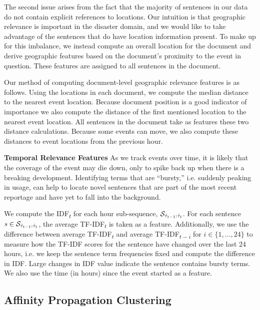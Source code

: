 The second issue arises from the fact that the majority of sentences in our
data do not contain explicit references to locations.  Our intuition is that
geographic relevance is important in the disaster domain, and we would like to
take advantage of the sentences that do have location information present. To
make up for this imbalance, we instead compute an overall location for the
document and derive geographic features based on the document's proximity to
the event in question. These features are assigned to all sentences in the
document.

Our method of computing document-level geographic relevance features is as
follows. Using the locations in each document, we compute the median distance
to the nearest event location. Because document position is a good indicator of
importance we also compute the distance of the first mentioned location to the
nearest event location. All sentences in the document take as features these
two distance calculations. Because some events can move, we also compute these
distances to event locations from the previous hour.

\textbf{Temporal Relevance Features} As we track events over time, it is likely
that the coverage of the event may die down, only to spike back up when there
is a breaking development.  Identifying terms that are ``bursty,'' i.e.
suddenly peaking in usage, can help to locate novel sentences that are part of
the most recent reportage and have yet to fall into the background.

We compute the IDF\textsubscript{$t$} for each hour sub-sequence,
$\mathcal{S}_{\hat{\tau}_{{t-1}}:\hat{\tau}_t}$. For each sentence $s \in
\mathcal{S}_{\hat{\tau}_{{t-1}}:\hat{\tau}_t}$, the average TF-IDF\textsubscript{$t$} is
taken as a feature. Additionally, we use the difference between average
TF-IDF\textsubscript{$t$} and average TF-IDF\textsubscript{$t-i$}  for $i \in
\{1, \ldots, 24\}$ to measure how the TF-IDF scores for the sentence have
changed over the last 24 hours, i.e. we keep the sentence term frequencies
fixed and compute the difference in IDF. Large changes in IDF value indicate
the sentence contains bursty terms.  We also use the time (in hours) since the
event started as a feature.

\subsection{{Affinity Propagation Clustering}}
\label{sec:exsel}

